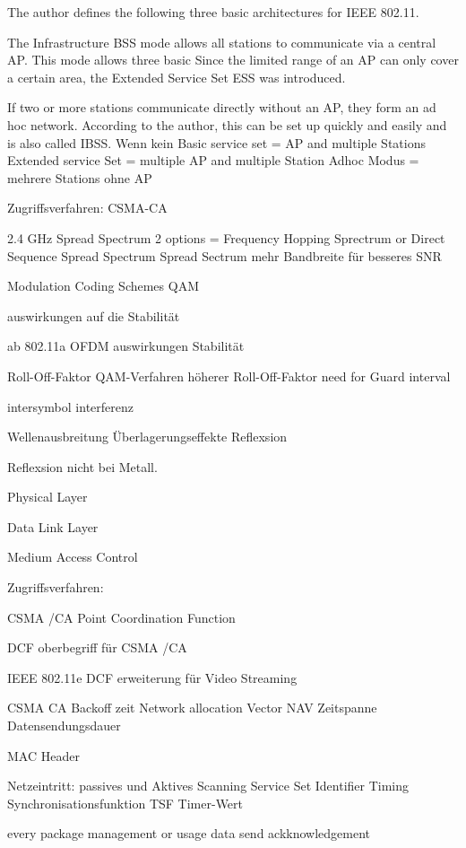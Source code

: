 \documentclass[]{nsm-thesis}
\begin{document}
The author defines the following three basic architectures for IEEE 802.11.

The Infrastructure \ac{BSS} mode allows all stations to communicate via a central \ac{AP}. This mode allows three basic
Since the limited range of an AP can only cover a certain area, the Extended Service Set ESS was introduced.

If two or more stations communicate directly without an AP, they form an ad hoc network. According to the author, this can be set up quickly and easily and is also called \ac{IBSS}.
Wenn kein 
Basic service set = AP and multiple Stations
Extended service Set = multiple AP and multiple Station
Adhoc Modus = mehrere Stations ohne AP

Zugriffsverfahren:
CSMA-CA

2.4 GHz  Spread Spectrum 2 options = Frequency Hopping Sprectrum or Direct Sequence Spread Spectrum
Spread Sectrum mehr Bandbreite für besseres SNR

Modulation Coding Schemes QAM

auswirkungen auf die Stabilität

ab 802.11a OFDM 
auswirkungen Stabilität


Roll-Off-Faktor 
QAM-Verfahren höherer Roll-Off-Faktor need for Guard interval

intersymbol interferenz


Wellenausbreitung
Überlagerungseffekte
Reflexsion

Reflexsion nicht bei Metall.



Physical Layer




Data Link Layer

Medium Access Control

Zugriffsverfahren:

CSMA /CA
Point Coordination Function

\textcite{sauter_wireless_2022}
DCF oberbegriff für CSMA /CA
 
IEEE 802.11e DCF erweiterung für Video Streaming

CSMA CA Backoff zeit
Network allocation Vector NAV Zeitspanne Datensendungsdauer

MAC Header

Netzeintritt:
passives und Aktives Scanning
Service Set Identifier
Timing Synchronisationsfunktion TSF Timer-Wert

\textcite{sauter_wireless_2022}
every package management or usage data send ackknowledgement
\end{document}

